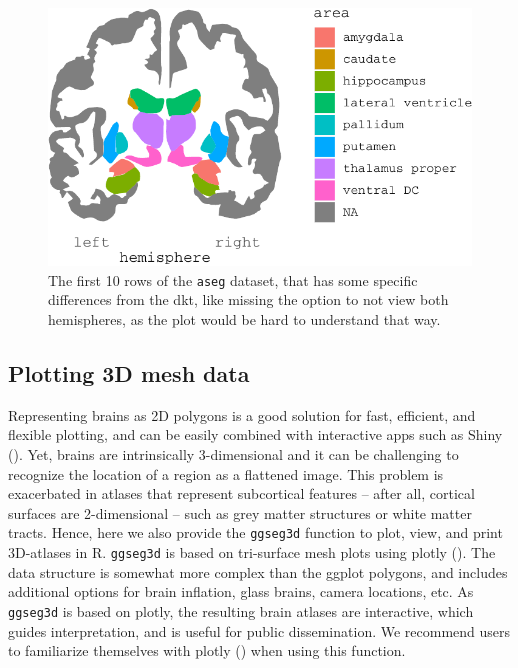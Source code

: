 \documentclass[fleqn,10pt]{wlpeerj} %
\begin{document}
\begin{figure}
\centering
\includegraphics{draft_2_files/figure-latex/atlases-1.pdf}
\caption{\label{fig:atlases}The first 10 rows of the \texttt{aseg} dataset, that has some specific differences from the dkt, like missing the option to not view both hemispheres, as the plot would be hard to understand that way.}
\end{figure}

\hypertarget{plotting-3d-mesh-data}{%
\subsection{Plotting 3D mesh data}\label{plotting-3d-mesh-data}}

Representing brains as 2D polygons is a good solution for fast, efficient, and flexible plotting, and can be easily combined with interactive apps such as Shiny (\citet{shiny}).
Yet, brains are intrinsically 3-dimensional and it can be challenging to recognize the location of a region as a flattened image.
This problem is exacerbated in atlases that represent subcortical features -- after all, cortical surfaces are 2-dimensional -- such as grey matter structures or white matter tracts.
Hence, here we also provide the \texttt{ggseg3d} function to plot, view, and print 3D-atlases in R.
\texttt{ggseg3d} is based on tri-surface mesh plots using plotly (\citet{plotly}).
The data structure is somewhat more complex than the ggplot polygons, and includes additional options for brain inflation, glass brains, camera locations, etc.
As \texttt{ggseg3d} is based on plotly, the resulting brain atlases are interactive, which guides interpretation, and is useful for public dissemination.
We recommend users to familiarize themselves with plotly (\citet{plotly}) when using this function.
\end{document}

